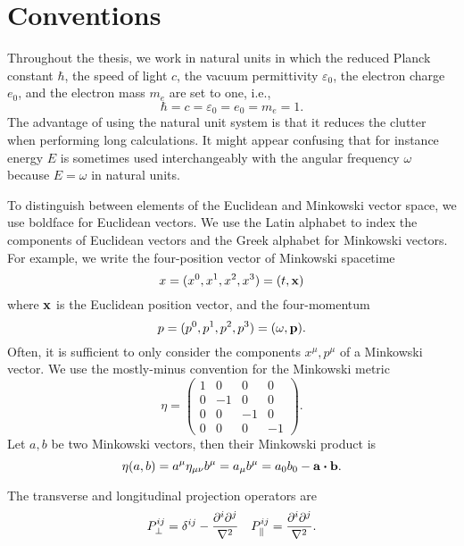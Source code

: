 \section{Conventions}

Throughout the thesis, we work in natural units in which the reduced Planck constant $\hbar$, the speed of light $c$, the vacuum permittivity $\varepsilon_0$, the electron charge $e_0$, and the electron mass $m_e$ are set to one, i.e.,
\begin{equation}
	\hbar
	=
	c
	=
	\varepsilon_0
	=
	e_0
	=
	m_e
	=
	1
	.
\end{equation}
The advantage of using the natural unit system is that it reduces the clutter when performing long calculations.
It might appear confusing that for instance energy $E$ is sometimes used interchangeably with the angular frequency $\omega$ because $E=\omega$ in natural units.

To distinguish between elements of the Euclidean and Minkowski vector space, we use boldface for Euclidean vectors.
We use the Latin alphabet to index the components of Euclidean vectors and the Greek alphabet for Minkowski vectors.
For example, we write the four-position vector of Minkowski spacetime
\begin{equation}
	x
	=
	(x^0,x^1,x^2,x^3)
	=
	(t,\vb{x})
\end{equation}
where $\vb{x}$ is the Euclidean position vector, and the four-momentum
\begin{equation}
	p
	=
	(p^0,p^1,p^2,p^3)
	=
	(\omega,\vb{p})
	.
\end{equation}
Often, it is sufficient to only consider the components $x^\mu,p^\mu$ of a Minkowski vector.
We use the mostly-minus convention for the Minkowski metric
\begin{equation}
	\eta
	=
	\begin{pmatrix}
		1 & 0 & 0 & 0 \\
		0 & -1 & 0 & 0 \\
		0 & 0 & -1 & 0 \\
		0 & 0 & 0 & -1
	\end{pmatrix}
	.
\end{equation}
Let $a,b$ be two Minkowski vectors, then their Minkowski product is
\begin{equation}
	\eta(a,b)
	=
	a^\mu
	\eta_{\mu\nu}
	b^\mu
	=
	a_\mu
	b^\mu
	=
	a_0b_0
	-
	\vb{a}\vdot\vb{b}
	.
\end{equation}

\begin{definition}\label{def:projector_long_trans}
	The transverse and longitudinal projection operators are
	\begin{align}
		P_\perp^{ij}
		=
		\delta^{ij}
		-
		\frac{\partial^i\partial^j}{\laplacian}
		&&
		P_\parallel^{ij}
		=
		\frac{\partial^i\partial^j}{\laplacian}
		\label{eq:projector_long_trans}
		.
	\end{align}
\end{definition}

